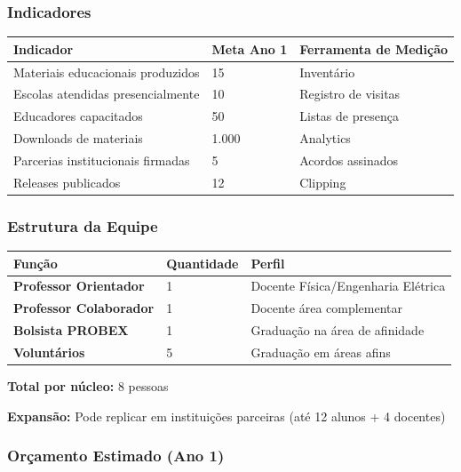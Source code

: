 \bigskip

\subsubsection{Indicadores}

\bigskip\noindent
\begin{tabular}{p{}p{}p{}}
\toprule
Indicador & Meta Ano 1 & Ferramenta de Medição \\
\hline
Materiais educacionais produzidos & 15 & Inventário \\
Escolas atendidas presencialmente & 10 & Registro de visitas \\
Educadores capacitados & 50 & Listas de presença \\
Downloads de materiais & 1.000 & Analytics \\
Parcerias institucionais firmadas & 5 & Acordos assinados \\
Releases publicados & 12 & Clipping \\
\bottomrule
\end{tabular}

\bigskip

\subsubsection{Estrutura da Equipe}

\bigskip\noindent
\begin{tabular}{p{}p{}p{}}
\toprule
Função & Quantidade & Perfil \\
\hline
\textbf{Professor Orientador} & 1 & Docente Física/Engenharia Elétrica \\
\textbf{Professor Colaborador} & 1 & Docente área complementar \\
\textbf{Bolsista PROBEX} & 1 & Graduação na área de afinidade \\
\textbf{Voluntários} & 5 & Graduação em áreas afins \\
\bottomrule
\end{tabular}

\bigskip

\textbf{Total por núcleo:} 8 pessoas

\textbf{Expansão:} Pode replicar em instituições parceiras (até 12 alunos + 4 docentes)

\subsubsection{Orçamento Estimado (Ano 1)}

